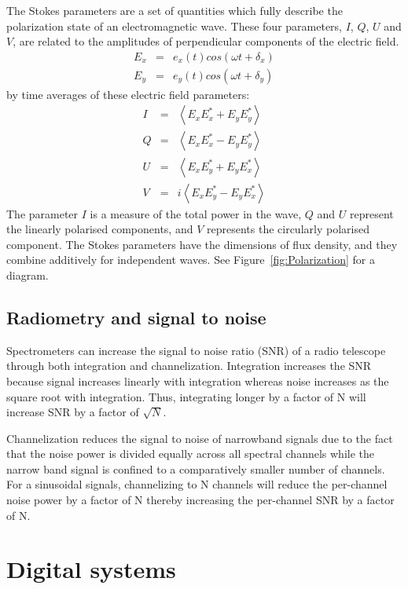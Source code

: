 \documentclass{ws-rv961x669}
\begin{document}
The Stokes parameters are a set of quantities which fully describe the polarization state of an electromagnetic wave. These four parameters, $I$, $Q$, $U$ and $V$, are related to the amplitudes of perpendicular components of the electric field.
\begin{eqnarray}
E_{x} & = & e_{x}(t)cos(\omega t+\delta_{x})\\
E_{y} & = & e_{y}(t)cos(\omega t+\delta_{y})
\end{eqnarray}
by time averages of these electric field parameters:
\begin{eqnarray}
I & = & \left\langle E_{x}E_{x}^{*}+E_{y}E_{y}^{*}\right\rangle \\
Q & = & \left\langle E_{x}E_{x}^{*}-E_{y}E_{y}^{*}\right\rangle \\
U & = & \left\langle E_{x}E_{y}^{*}+E_{y}E_{x}^{*}\right\rangle \\
V & = & i\left\langle E_{x}E_{y}^{*}-E_{y}E_{x}^{*}\right\rangle 
\end{eqnarray}
The parameter $I$ is a measure of the total power in the wave, $Q$
and $U$ represent the linearly polarised components, and $V$ represents
the circularly polarised component. The Stokes parameters have the
dimensions of flux density, and they combine additively for independent
waves. See Figure~\ref{fig:Polarization} for a diagram.

\subsection{Radiometry and signal to noise}

Spectrometers can increase the signal to noise ratio (SNR) of a radio telescope through both integration and channelization. Integration increases the SNR because signal increases linearly with integration whereas noise increases as the square root with integration. Thus, integrating longer by a factor of N will increase SNR by a factor of $\sqrt{N}$.

Channelization reduces the signal to noise of narrowband signals due to the fact that the noise power is divided equally across all spectral channels while the narrow band signal is confined to a comparatively smaller number of channels. For a sinusoidal signals, channelizing to N channels will reduce the per-channel noise power by a factor of N thereby increasing the per-channel SNR by a factor of N.




\section{Digital systems}
\end{document}
